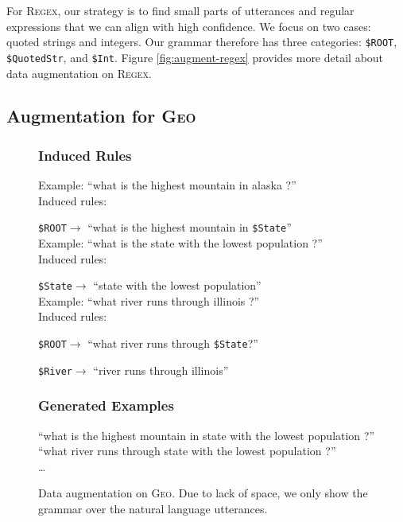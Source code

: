 \documentclass[11pt,letterpaper]{article}
\newcommand{\regex}{\textsc{Regex}\xspace}
\newcommand{\geo}{\textsc{Geo}\xspace}
\newcommand{\catroot}{\texttt{\$ROOT}\xspace}
\newcommand{\catstate}{\texttt{\$State}\xspace}
\newcommand{\catriver}{\texttt{\$River}\xspace}
\begin{document}
For \regex, our strategy is to find small parts of
utterances and regular expressions that we can align with high confidence.
We focus on two cases: quoted strings and integers.
Our grammar therefore has three categories: 
\texttt{\$ROOT}, \texttt{\$QuotedStr}, and \texttt{\$Int}.
Figure \ref{fig:augment-regex}
provides more detail about data augmentation on \regex.



\subsection{Augmentation for \geo}
\begin{figure}[t] 
\small
\begin{framed}
\footnotesize
\subsubsection*{Induced Rules}
Example: ``what is the highest mountain in alaska ?''\\
Induced rules:

\quad \catroot $\to$ ``what is the highest mountain in \catstate ''\\

Example: ``what is the state with the lowest population ?''\\
Induced rules:

\quad \catstate $\to$ ``state with the lowest population''\\

Example: ``what river runs through illinois ?''\\
Induced rules:

\quad \catroot $\to$ ``what river runs through \catstate ?''

\quad \catriver $\to$ ``river runs through illinois''

\subsubsection*{Generated Examples} 
``what is the highest mountain in state with the lowest population ?'' \\
``what river runs through state with the lowest population ?'' \\
\dots
\end{framed}
\caption{Data augmentation on \geo.  Due to lack of space,
we only show the grammar over the natural language utterances.}
\label{fig:augment-geo}
\end{figure}
\end{document}
